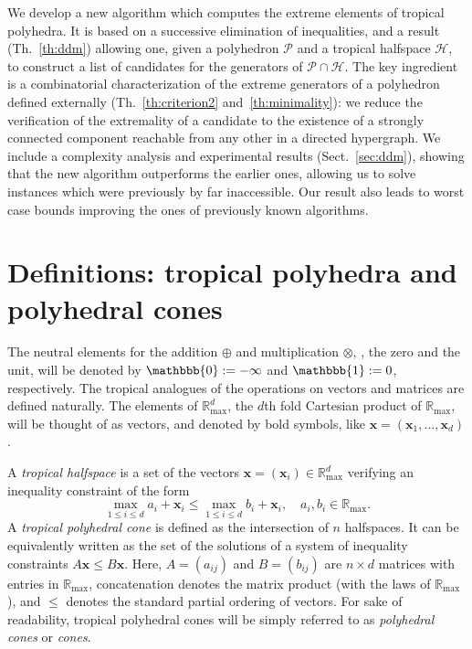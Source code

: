 \documentclass[proceedings]{stacs}
\newcommand{\mpplus}{\oplus}
\newcommand{\mptimes}{\otimes}
\newcommand{\maxplus}{\mathbb{R}_{\max}}
\newcommand{\defin}{:=}\newcommand{\mpzero}{\mathbbb{0}}
\newcommand{\mpone}{\mathbbb{1}}
\newcommand{\vect}[1]{\boldsymbol #1}
\newcommand{\PP}{\mathcal{P}}
\newcommand{\HH}{\mathcal{H}}
\begin{document}
\medskip{}
We develop a new algorithm which computes the extreme elements of tropical polyhedra. It is based on a successive elimination of inequalities, and 
a result (Th.~\ref{th:ddm}) allowing one, given a polyhedron $\PP$ and a tropical halfspace $\HH$, to construct
a list of candidates for the generators of $\PP \cap \HH$.
The key ingredient is a combinatorial characterization of the extreme generators
of a polyhedron defined externally (Th.~\ref{th:criterion2} and~\ref{th:minimality}): we reduce the verification of the extremality of a candidate to the existence of a strongly connected component reachable from any other in a directed hypergraph. 
We include a complexity analysis and experimental results (Sect.~\ref{sec:ddm}),
showing that the new algorithm outperforms the earlier ones, allowing us to solve instances which were previously by far inaccessible. Our result
also leads to worst case bounds improving the ones of previously known algorithms. 


\section{Definitions: tropical polyhedra and polyhedral cones}\label{sec:definition}
The neutral elements for the addition $\mpplus$ and multiplication $\mptimes$, \ie{}, the zero and the unit, will be denoted by $\mpzero\defin-\infty$ and $\mpone\defin 0$, respectively.
The tropical analogues of the operations on vectors and matrices are
defined naturally. The elements of $\maxplus^d$, 
the $d$th fold Cartesian product of $\maxplus$,
will be thought of as vectors, and denoted by bold symbols, 
like $\vect x=(\vect{x}_1,\ldots, \vect{x}_d)$.

A \emph{tropical halfspace} is a set of the vectors $\vect{x} = (\vect{x}_i)\in \maxplus^d$ verifying an inequality constraint of the form 
\[
\max_{1\leq i\leq d} a_i +\vect{x}_i \leq \max_{1\leq i\leq d} b_i + \vect{x}_i, \quad a_i, b_i \in \maxplus.
\]
A \emph{tropical polyhedral cone} is 
defined as the intersection of $n$ halfspaces. It can be equivalently written as the set of the solutions of a system of inequality constraints $A \vect{x} \leq B \vect{x}$.
Here, $A=(a_{ij})$ and $B=(b_{ij})$ are $n \times d$ matrices with entries in $\maxplus$, concatenation denotes the matrix product (with the laws of $\maxplus$), and $\leq$ denotes
the standard partial ordering of vectors. For sake of readability, tropical polyhedral cones will be simply referred to as \emph{polyhedral cones} or \emph{cones}.
\end{document}
